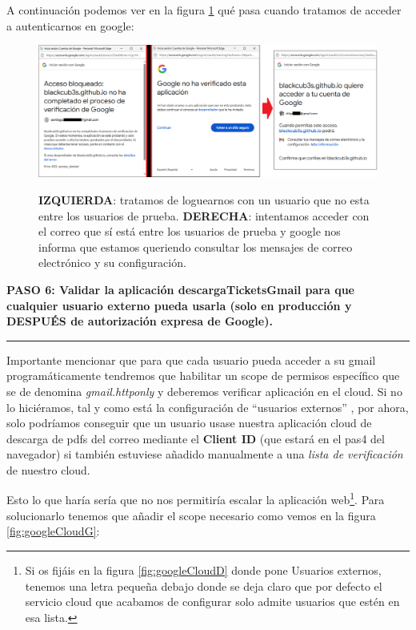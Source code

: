 \documentclass[a4paper,12pt]{report}
\begin{document}
	A continuación podemos ver en la figura \ref{fig:googleCloudI} qué pasa cuando tratamos de acceder a autenticarnos en google:
	
	
	
	
	\FloatBarrier
	\setlength{\belowcaptionskip}{3pt}
	\begin{figure}[H]
		\centering
		\caption{\textbf{IZQUIERDA}: tratamos de loguearnos con un usuario que no esta entre los usuarios de prueba. \textbf{DERECHA}: intentamos acceder con el correo que sí está entre los usuarios de prueba y google nos informa que estamos queriendo consultar los mensajes de correo electrónico y su configuración.}
		\includegraphics[width=1\linewidth]{img/googleCloudI}
		\label{fig:googleCloudI}
	\end{figure}
	\FloatBarrier
	
	
	
	
	\noindent \textbf{PASO 6: Validar la aplicación descargaTicketsGmail para que cualquier usuario externo pueda usarla (solo en producción y DESPUÉS de autorización expresa de Google).}
	\vspace{.1em}
	\hrule
	\vspace{.5em}
	
	
	Importante mencionar que para que cada usuario pueda acceder a su gmail programáticamente tendremos que habilitar un scope de permisos específico que se de denomina \textit{gmail.httponly} y deberemos verificar aplicación en el cloud. Si no lo hiciéramos, tal y como está la configuración de ``usuarios externos'' , por ahora, solo podríamos conseguir que un usuario usase nuestra aplicación cloud de descarga de pdfs del correo mediante el \textbf{Client ID} (que estará en el pas4 del navegador) si también estuviese añadido manualmente a una \textit{lista de verificación} de nuestro cloud.
	
	Esto lo que haría sería que no nos permitiría escalar la aplicación web\footnote{Si os fijáis en la figura \ref{fig:googleCloudD} donde pone Usuarios externos, tenemos una letra pequeña debajo donde se deja claro que por defecto el servicio cloud que acabamos de configurar solo admite usuarios que estén en esa lista.}. Para solucionarlo tenemos que añadir el scope necesario como vemos en la figura \ref{fig:googleCloudG}:
	
\end{document}
